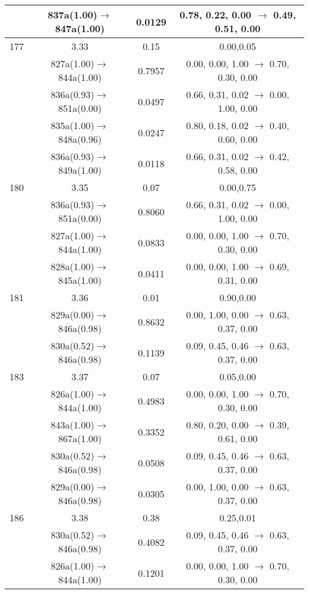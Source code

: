 \documentclass[10pt,a4paper]{article}
\begin{document}
\begin{longtable}{c|c|c|c}
 	& 837a(1.00)$\rightarrow$847a(1.00) &	 0.0129 &	 0.78, 0.22, 0.00 $\rightarrow$ 0.49, 0.51, 0.00 \\ 
 \hline177 &	 3.33 &	 0.15 &	 0.00,0.05 \\ 
  	& 827a(1.00)$\rightarrow$844a(1.00) &	 0.7957 &	 0.00, 0.00, 1.00 $\rightarrow$ 0.70, 0.30, 0.00 \\ 
 	& 836a(0.93)$\rightarrow$851a(0.00) &	 0.0497 &	 0.66, 0.31, 0.02 $\rightarrow$ 0.00, 1.00, 0.00 \\ 
 	& 835a(1.00)$\rightarrow$848a(0.96) &	 0.0247 &	 0.80, 0.18, 0.02 $\rightarrow$ 0.40, 0.60, 0.00 \\ 
 	& 836a(0.93)$\rightarrow$849a(1.00) &	 0.0118 &	 0.66, 0.31, 0.02 $\rightarrow$ 0.42, 0.58, 0.00 \\ 
 \hline180 &	 3.35 &	 0.07 &	 0.00,0.75 \\ 
  	& 836a(0.93)$\rightarrow$851a(0.00) &	 0.8060 &	 0.66, 0.31, 0.02 $\rightarrow$ 0.00, 1.00, 0.00 \\ 
 	& 827a(1.00)$\rightarrow$844a(1.00) &	 0.0833 &	 0.00, 0.00, 1.00 $\rightarrow$ 0.70, 0.30, 0.00 \\ 
 	& 828a(1.00)$\rightarrow$845a(1.00) &	 0.0411 &	 0.00, 0.00, 1.00 $\rightarrow$ 0.69, 0.31, 0.00 \\ 
 \hline181 &	 3.36 &	 0.01 &	 0.90,0.00 \\ 
  	& 829a(0.00)$\rightarrow$846a(0.98) &	 0.8632 &	 0.00, 1.00, 0.00 $\rightarrow$ 0.63, 0.37, 0.00 \\ 
 	& 830a(0.52)$\rightarrow$846a(0.98) &	 0.1139 &	 0.09, 0.45, 0.46 $\rightarrow$ 0.63, 0.37, 0.00 \\ 
 \hline183 &	 3.37 &	 0.07 &	 0.05,0.00 \\ 
  	& 826a(1.00)$\rightarrow$844a(1.00) &	 0.4983 &	 0.00, 0.00, 1.00 $\rightarrow$ 0.70, 0.30, 0.00 \\ 
 	& 843a(1.00)$\rightarrow$867a(1.00) &	 0.3352 &	 0.80, 0.20, 0.00 $\rightarrow$ 0.39, 0.61, 0.00 \\ 
 	& 830a(0.52)$\rightarrow$846a(0.98) &	 0.0508 &	 0.09, 0.45, 0.46 $\rightarrow$ 0.63, 0.37, 0.00 \\ 
 	& 829a(0.00)$\rightarrow$846a(0.98) &	 0.0305 &	 0.00, 1.00, 0.00 $\rightarrow$ 0.63, 0.37, 0.00 \\ 
 \hline186 &	 3.38 &	 0.38 &	 0.25,0.01 \\ 
  	& 830a(0.52)$\rightarrow$846a(0.98) &	 0.4082 &	 0.09, 0.45, 0.46 $\rightarrow$ 0.63, 0.37, 0.00 \\ 
 	& 826a(1.00)$\rightarrow$844a(1.00) &	 0.1201 &	 0.00, 0.00, 1.00 $\rightarrow$ 0.70, 0.30, 0.00 \\ 

\end{longtable}
\end{document}
